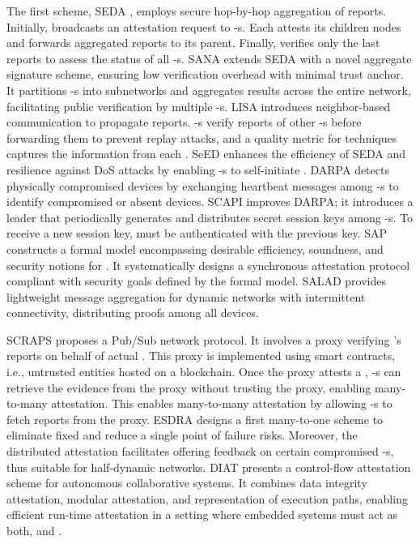 The first scheme, SEDA \cite{asokan2015seda}, employs secure hop-by-hop aggregation of \ra reports. 
Initially, \vrf broadcasts an attestation request to \prv-s. Each \prv attests its children nodes and forwards aggregated \ra reports to its parent. Finally, \vrf verifies only the last \ra reports to assess the status of all \prv-s.
SANA \cite{ambrosin2016sana} extends SEDA with a novel aggregate signature scheme, ensuring low verification overhead with minimal trust anchor.
It partitions \prv-s into subnetworks and aggregates \ra results across the entire network, facilitating public verification by multiple \vrf-s.
LISA \cite{carpent2017lightweight} introduces neighbor-based communication to propagate \ra reports. \prv-s verify \ra reports of other \prv-s before forwarding them to prevent replay attacks, and a quality metric for \sa techniques captures the information from each \prv.
SeED \cite{ibrahim2017seed} enhances the efficiency of SEDA and resilience against DoS attacks by enabling \prv-s to self-initiate \ra.
DARPA \cite{ibrahim2016darpa} detects physically compromised devices by exchanging heartbeat messages among \prv-s to identify compromised or absent devices.
SCAPI \cite{kohnhauser2017scapi} improves DARPA;  it introduces a leader that periodically generates and distributes secret session keys among \prv-s. To receive a new session key, \prv must be authenticated with the previous key.
SAP \cite{nunes2019towards} constructs a formal model encompassing desirable efficiency, soundness, and security notions for \sa. It systematically designs a synchronous attestation protocol compliant with security goals defined by the formal model.
SALAD \cite{kohnhauser2018salad} provides lightweight message aggregation for dynamic networks with intermittent connectivity, distributing \ra proofs among all devices.

SCRAPS \cite{petzi2022scraps} proposes a Pub/Sub network \sa protocol. It involves a proxy verifying \prv’s \ra reports on behalf of actual \vrf.
This proxy is implemented using smart contracts, i.e., untrusted entities hosted on a blockchain.
Once the proxy attests a \prv, \vrf-s can retrieve the \ra evidence from the proxy without trusting the proxy, enabling many-to-many attestation.
This enables many-to-many attestation by allowing \vrf-s to fetch \ra reports from the proxy.
ESDRA \cite{kuang2019esdra} designs a first many-to-one \sa scheme to eliminate fixed \vrf and reduce a single point of failure \vrf risks.
Moreover, the distributed attestation facilitates offering feedback on certain compromised \prv-s, thus suitable for half-dynamic networks.
DIAT \cite{abera2019diat} presents a control-flow attestation scheme for autonomous collaborative systems.
It combines data integrity attestation, modular attestation, and representation of execution paths, enabling efficient run-time attestation in a setting where embedded systems must act as both, \prv and \vrf.



